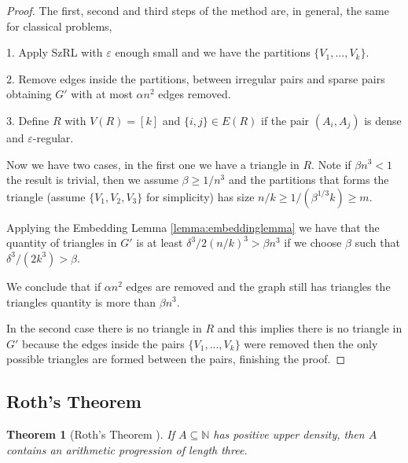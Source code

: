 \documentclass[12pt,twoside,a4paper,bibliography=totocnumbered]{book}
\numberwithin{equation}{section}
\newtheorem{theorem}             {Theorem}[section]
\theoremstyle{remark}
\begin{document}
\begin{proof}
The first, second and third steps of the method are, in general, the same for classical problems,

1. Apply SzRL with $\varepsilon$ enough small and we have the partitions $\{V_1, ... , V_k\}$.

2. Remove edges inside the partitions, between irregular pairs and sparse pairs obtaining $G'$ with at most $\alpha n^2$ edges removed.

3. Define $R$ with $V(R) = [k]$ and $\{i,j\} \in E(R) $ if  the pair $(A_i, A_j)$ is dense and $\varepsilon$-regular.

Now we have two cases, in the first one we have a triangle in $R$. Note if $\beta n^3 < 1$ the result is trivial, then we assume $\beta \geq 1/n^3$ and the partitions that forms the triangle (assume $\{V_1, V_2, V_3\}$ for simplicity) has size $n/k \geq 1/(\beta ^{1/3} k) \geq m$.

Applying the Embedding Lemma \ref{lemma:embeddinglemma} we have that the quantity of triangles in $G'$ is at least $\delta ^3 /2 (n/k)^3 > \beta n^3$ if we choose $\beta$ such that $\delta ^3 / (2k^3) > \beta$.

We conclude that if $\alpha n^2$ edges are removed and the graph still has triangles the triangles quantity is more than $\beta n^3$.

In the second case there is no triangle in $R$ and this implies there is no triangle in $G'$ because the edges inside the pairs $\{V_1, ... , V_k\}$ were removed then the only possible triangles are formed between the pairs, finishing the proof.
\end{proof}


\subsection{Roth's Theorem}

\begin{theorem}[{Roth's Theorem \cite{Ro53}}] If $A \subseteq \mathbb{N}$ has positive upper density, then $A$ contains an arithmetic progression of length three. 
\end{theorem}
\end{document}
